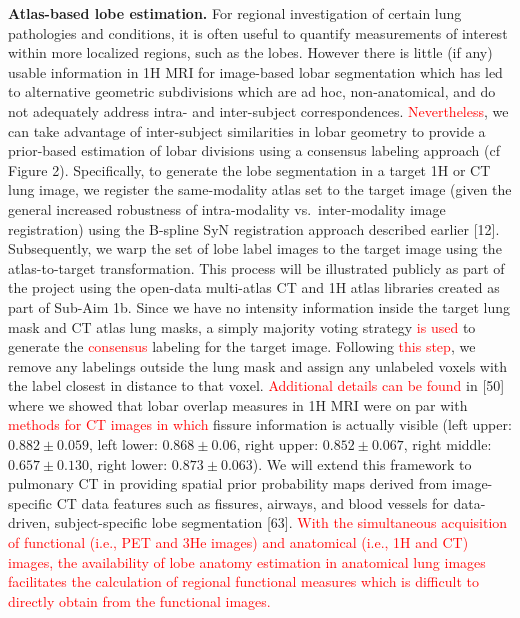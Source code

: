 \documentclass[11pt,]{article}
\begin{document}


\textbf{Atlas-based lobe estimation.} For regional investigation of
certain lung pathologies and conditions, it is often useful to quantify
measurements of interest within more localized regions, such as the
lobes. However there is little (if any) usable information in 1H MRI for
image-based lobar segmentation which has led to alternative geometric
subdivisions which are ad hoc, non-anatomical, and do not adequately
address intra- and inter-subject correspondences.
\textcolor{red}{Nevertheless}, we can take advantage of inter-subject
similarities in lobar geometry to provide a prior-based estimation of
lobar divisions using a consensus labeling approach (cf Figure 2).
Specifically, to generate the lobe segmentation in a target 1H or CT
lung image, we register the same-modality atlas set to the target image
(given the general increased robustness of intra-modality
vs.~inter-modality image registration) using the B-spline SyN
registration approach described earlier {[}12{]}. Subsequently, we warp
the set of lobe label images to the target image using the
atlas-to-target transformation. This process will be illustrated
publicly as part of the project using the open-data multi-atlas CT and
1H atlas libraries created as part of Sub-Aim 1b. Since we have no
intensity information inside the target lung mask and CT atlas lung
masks, a simply majority voting strategy \textcolor{red}{is used} to
generate the \textcolor{red}{consensus} labeling for the target image.
Following \textcolor{red}{this step}, we remove any labelings outside
the lung mask and assign any unlabeled voxels with the label closest in
distance to that voxel. \textcolor{red}{Additional details can be found}
in {[}50{]} where we showed that lobar overlap measures in 1H MRI were
on par with \textcolor{red}{methods for CT images  in which} fissure
information is actually visible (left upper: \(0.882 \pm 0.059\), left
lower: \(0.868 \pm 0.06\), right upper: \(0.852 \pm 0.067\), right
middle: \(0.657 \pm 0.130\), right lower: \(0.873 \pm 0.063\)). We will
extend this framework to pulmonary CT in providing spatial prior
probability maps derived from image-specific CT data features such as
fissures, airways, and blood vessels for data-driven, subject-specific
lobe segmentation {[}63{]}.
\textcolor{red}{With the simultaneous acquisition of functional (i.e., PET and 3He images)
and anatomical (i.e., 1H and CT) images, the availability of lobe anatomy estimation
in anatomical lung images facilitates the calculation of regional functional measures which
is difficult to directly obtain from the functional images.}
\end{document}
